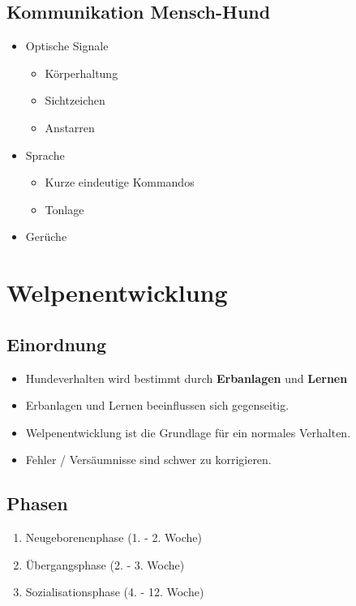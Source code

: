     \subsection{Kommunikation Mensch-Hund}
        \begin{itemize}
            \item Optische Signale
            \begin{itemize}
                \item Körperhaltung
                \item Sichtzeichen
                \item Anstarren
            \end{itemize}
            \item Sprache
            \begin{itemize}
                \item Kurze eindeutige Kommandos
                \item Tonlage
            \end{itemize}
            \item Gerüche
        \end{itemize}


\section{Welpenentwicklung}

    \subsection{Einordnung}
        \begin{itemize}
            \item Hundeverhalten wird bestimmt durch \textbf{Erbanlagen} und \textbf{Lernen}
            \item Erbanlagen und Lernen beeinflussen sich gegenseitig.
        \end{itemize}

        \begin{itemize}
            \item Welpenentwicklung ist die Grundlage für ein normales Verhalten.
            \item Fehler / Versäumnisse sind schwer zu korrigieren.
        \end{itemize}

    \subsection{Phasen}
        \begin{enumerate}
            \item Neugeborenenphase (1. - 2. Woche)
            \item Übergangsphase (2. - 3. Woche)
            \item Sozialisationsphase (4. - 12. Woche)
        \end{enumerate}


